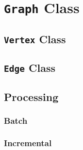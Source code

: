 \section{\texttt{Graph} Class}
\subsection{\texttt{Vertex} Class}
\subsection{\texttt{Edge} Class}
\subsection{Processing}
\subsubsection{Batch}
\subsubsection{Incremental}